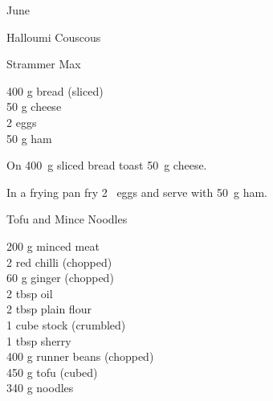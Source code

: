 \begin{menu}{June}
\begin{recipe}{2}{Halloumi Couscous}
\begin{instructions}
    \end{instructions}
    \end{recipe}%
  
    \begin{recipe}{1}{Strammer Max}%
		\begin{ingredients}
		400 g bread (sliced) \\
	50 g cheese  \\
	2  eggs  \\
	50 g ham  \\
	
		\end{ingredients}
	
	
    \begin{instructions}
    \item 
        On
        400~g sliced bread
        toast
        50~g  cheese.
      \item 
        In a frying pan fry
        2~  eggs
        and serve with
        50~g  ham.
      
    \end{instructions}
    \end{recipe}%
  
    \begin{recipe}{2}{Tofu and Mince Noodles}%
		\begin{ingredients}
		200 g minced meat  \\
	2  red chilli (chopped) \\
	60 g ginger (chopped) \\
	2 tbsp oil  \\
	2 tbsp plain flour  \\
	1 cube stock (crumbled) \\
	1 tbsp sherry  \\
	400 g runner beans (chopped) \\
	450 g tofu (cubed) \\
	340 g noodles  \\
	
		\end{ingredients}
	
	

\end{recipe}
\end{menu}
